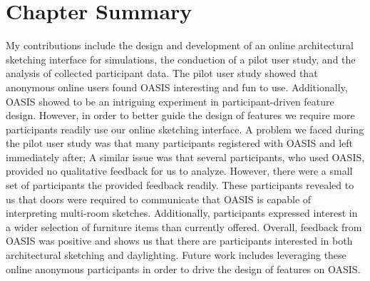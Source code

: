 
\section{ Chapter Summary }

	

My contributions include the design and development of an online architectural sketching interface for simulations, the conduction of a pilot user study, and the analysis of collected participant data.
The pilot user study showed that anonymous online users found OASIS interesting and fun to use. 
Additionally, OASIS showed to be an intriguing experiment in participant-driven feature design. 
However, in order to better guide the design of features we require more participants readily use our online sketching interface. A problem we faced during the pilot user study was that many participants registered with OASIS and left immediately after;
A similar issue was that several participants, who used OASIS, provided no qualitative feedback for us to analyze. 
However, there were a small set of participants the provided feedback readily. 
These participants revealed to us that doors were required to communicate that OASIS is capable of interpreting multi-room sketches. Additionally, participants expressed interest in a wider selection of furniture items than currently offered.
Overall, feedback from OASIS was positive and shows us that there are participants interested in both architectural sketching and daylighting. Future work includes leveraging these online anonymous participants in order to drive the design of features on OASIS.







